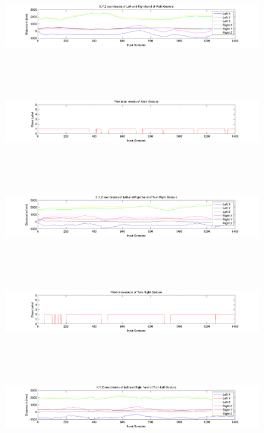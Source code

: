 \begin{figure}	
	\hspace{-35 mm} 
	\includegraphics[height=37mm]{figures/result/test-axis-walk.jpg} 
\end{figure}
\begin{figure}
	\hspace{-35 mm} 
	\includegraphics[height=37mm]{figures/result/test-prediction-walk.jpg} 
\end{figure}
\begin{figure}
	\hspace{-35 mm} 
	\includegraphics[height=37mm]{figures/result/test-axis-turn-right.jpg} 
\end{figure}
\begin{figure}
	\hspace{-35 mm} 
	\includegraphics[height=37mm]{figures/result/test-prediction-turn-right.jpg} 
\end{figure}
\begin{figure}
	\hspace{-35 mm} 
	\includegraphics[height=37mm]{figures/result/test-axis-turn-left.jpg} 
\end{figure}
